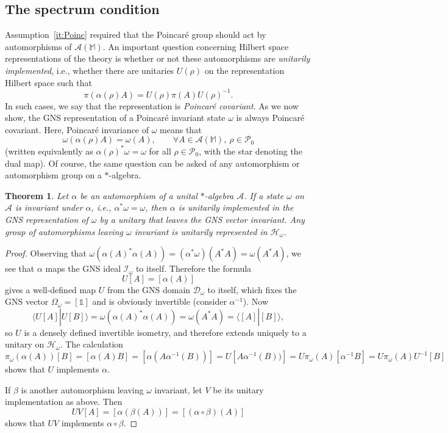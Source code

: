 \documentclass[12pt,a4paper]{article}
\newcommand{\1}{\mathds{1}}                         %
\newcommand{\MM}{\mathbb{M}}
\newcommand{\HH}{{\mathcal{H}}}
\newcommand{\DD}{{\mathscr{D}}}
\newcommand{\II}{{\mathbb{1}}}
\newcommand{\Ac}{{\mathcal{A}}}
\newcommand{\Ic}{{\mathcal{I}}}
\newcommand{\Pc}{{\mathcal{P}}}
\newcommand{\ip}[2]{\langle #1|#2\rangle}
\newtheorem{theorem}{Theorem}%
\begin{document}
\subsection{The spectrum condition}
Assumption~\ref{it:Poinc} required that
the Poincar\'e group should act by automorphisms of $\Ac(\MM)$. An important question concerning Hilbert space representations of the theory is whether or not these automorphisms are \emph{unitarily implemented}, i.e., whether there are unitaries $U(\rho)$ on the representation Hilbert space such that
\[
\pi(\alpha(\rho)A) = U(\rho) \pi(A) U(\rho)^{-1}.
\]
In such cases, we say that the representation is \emph{Poincar\'e covariant}.
As we now show, the GNS representation of a Poincar\'e invariant state $\omega$ is always Poincar\'e covariant. Here, Poincar\'e invariance of $\omega$ means that 
\[
\omega(\alpha(\rho)A) = \omega(A), \qquad\forall A\in\Ac(\MM),~\rho\in\Pc_0
\] 
(written equivalently as $\alpha(\rho)^*\omega=\omega$ for all $\rho\in\Pc_0$, with the star denoting the dual map). Of course, the same question can be asked of any automorphism or automorphism group on a $*$-algebra.
\begin{theorem}
	Let $\alpha$ be an automorphism of a unital $*$-algebra $\Ac$. If a state $\omega$ on $\Ac$ is invariant under $\alpha$, i.e., $\alpha^*\omega=\omega$, then $\alpha$ is unitarily implemented in the GNS representation of $\omega$ by a unitary that leaves the GNS vector invariant. Any group of automorphisms leaving $\omega$ invariant is unitarily represented in $\HH_\omega$. 
\end{theorem}
\begin{proof}
	Observing that $\omega(\alpha(A)^*\alpha(A))=(\alpha^*\omega)(A^*A)=\omega(A^*A)$, we see that $\alpha$ maps the GNS ideal $\Ic_\omega$ to itself. Therefore the formula
	\[
	U[A] = [\alpha(A)]
	\]
	gives a well-defined map $U$ from the GNS domain $\DD_\omega$ to itself, which fixes the GNS vector $\Omega_\omega=[\II]$ and is obviously invertible (consider $\alpha^{-1}$). Now
	\[
	\ip{U[A]}{U[B]} = \omega(\alpha(A)^*\alpha(A)) = \omega(A^*A) = \ip{[A]}{[B]},
	\]	
	so $U$ is a densely defined invertible isometry, and therefore extends uniquely to a unitary on $\HH_\omega$. The calculation
	\[
	\pi_\omega(\alpha(A))[B] = [\alpha(A)B] = [\alpha(A\alpha^{-1}(B))] = U[A\alpha^{-1}(B))] = U\pi_\omega(A)[\alpha^{-1}B] = U\pi_\omega(A)U^{-1}[B]
	\]
	shows that $U$ implements $\alpha$. 
	
	If $\beta$ is another automorphism leaving $\omega$ invariant, let $V$ be its unitary implementation as above. Then 
	\[
	UV[A]= [\alpha(\beta(A))] = [(\alpha\circ\beta)(A)]
	\]
	shows that $UV$ implements $\alpha\circ\beta$. 
\end{proof}
\end{document}
